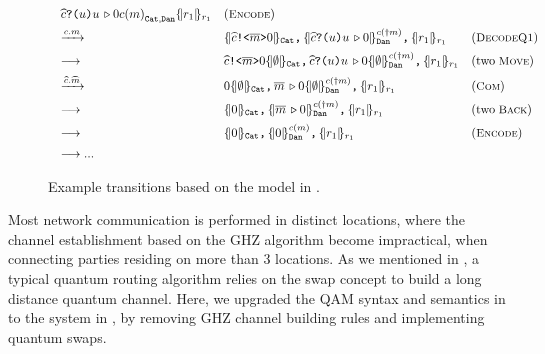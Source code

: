 \begin{figure}[t]
{\[\begin{array}{l}
\begin{array}{lll}
{{   {\crev{\wideparen{c}}{u}{\encode{u}0}}}{c(m)}_{\cn{Cat},\cn{Dan}}}
{\scell{r_1}_{r_1}}
&
(\rulelab{Encode})
\\[0.5em]
\xrightarrow{c.m}
&
\pard{\pard{\scell{{\csend{\wideparen{c}}{\overline{m}}{0}}}_{\cn{Cat}}}
     {\pscell{\crev{\wideparen{c}}{u}{\encode{u}0}}{c(\up{m})}_{\cn{Dan}}}}
  {\scell{r_1}_{r_1}}
&
(\rulelab{DecodeQ1})
\\[0.5em]
\longrightarrow
&
\pard{\pard{\csend{\wideparen{c}}{\overline{m}}{0}\scell{\emptyset}_{\cn{Cat}}}
     {\crev{\wideparen{c}}{u}{\encode{u}0}\pscell{\emptyset}{c(\up{m})}_{\cn{Dan}}}}
  {\scell{r_1}_{r_1}}
&
(\text{two}\;\rulelab{Move})
\\[0.5em]
\xrightarrow{\wideparen{c}.\wideparen{m}}
&
\pard{\pard{0\scell{\emptyset}_{\cn{Cat}}}
     {{\encode{\overline{m}}0}\pscell{\emptyset}{c(\up{m})}_{\cn{Dan}}}}
  {\scell{r_1}_{r_1}}
&
(\rulelab{Com})
\\[0.5em]
\longrightarrow
&
\pard{\pard{\scell{0}_{\cn{Cat}}}
     {\pscell{{\encode{\overline{m}}0}}{c(\up{m})}_{\cn{Dan}}}}
  {\scell{r_1}_{r_1}}
&
(\text{two}\;\rulelab{Back})
\\[0.5em]
\longrightarrow
&
\pard{\pard{\scell{0}_{\cn{Cat}}}
     {\pscell{{0}}{c(m)}_{\cn{Dan}}}}
  {\scell{r_1}_{r_1}}
&
(\rulelab{Encode})
\\[0.5em]
\longrightarrow...
\end{array}
\end{array}
\]
}
\caption{Example transitions based on the model in .}
  \label{fig:q-pi-example}
\end{figure}

Most network communication is performed in distinct locations,
where the channel establishment based on the GHZ algorithm become impractical, when connecting parties residing on more than $3$ locations. As we mentioned in , a typical quantum routing algorithm relies on the swap concept to build a long distance quantum channel. Here, we upgraded the QAM syntax and semantics in  to the system in , by removing GHZ channel building rules and implementing quantum swaps.

